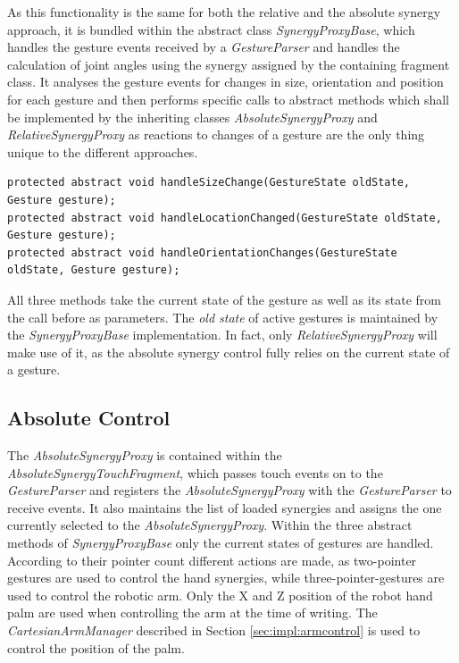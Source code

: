 As this functionality is the same for both the relative and the absolute synergy approach, it is bundled within the abstract class \textit{SynergyProxyBase}, which handles the gesture events received by a \textit{GestureParser} and handles the calculation of joint angles using the synergy assigned by the containing fragment class. It analyses the gesture events for changes in size, orientation and position for each gesture and then performs specific calls to abstract methods which shall be implemented by the inheriting classes \textit{AbsoluteSynergyProxy} and \textit{RelativeSynergyProxy} as reactions to changes of a gesture are the only thing unique to the different approaches.
\begin{lstlisting}
protected abstract void handleSizeChange(GestureState oldState, Gesture gesture);
protected abstract void handleLocationChanged(GestureState oldState, Gesture gesture);
protected abstract void handleOrientationChanges(GestureState oldState, Gesture gesture);
\end{lstlisting}
All three methods take the current state of the gesture as well as its state from the call before as parameters. The \textit{old state} of active gestures is maintained by the \textit{SynergyProxyBase} implementation. In fact, only \textit{RelativeSynergyProxy} will make use of it, as the absolute synergy control fully relies on the current state of a gesture.

\subsection{Absolute Control}
\label{sec:impl:syn:absc}
The \textit{AbsoluteSynergyProxy} is contained within the \textit{AbsoluteSynergyTouchFragment}, which passes touch events on to the \textit{GestureParser} and registers the \textit{AbsoluteSynergyProxy} with the \textit{GestureParser} to receive events. It also maintains the list of loaded synergies and assigns the one currently selected to the \textit{AbsoluteSynergyProxy}. Within the three abstract methods of \textit{SynergyProxyBase} only the current states of gestures are handled. According to their pointer count different actions are made, as two-pointer gestures are used to control the hand synergies, while three-pointer-gestures are used to control the robotic arm. Only the X and Z position of the robot hand palm are used when controlling the arm at the time of writing. The \textit{CartesianArmManager} described in Section \ref{sec:impl:armcontrol} is used to control the position of the palm. 

